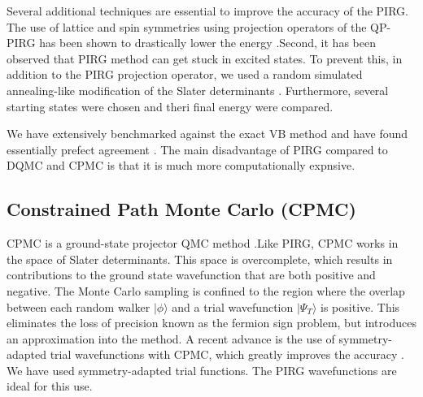\documentclass[a4paper,12pt]{article}
\begin{document}
Several additional techniques are essential to improve the accuracy of the PIRG. The use of lattice and spin symmetries using projection 
operators of the QP-PIRG has been shown to drastically lower the energy \cite{mizusaki06a}.Second, it has been observed that PIRG method can get 
stuck in excited states. To prevent this, in addition to the PIRG projection operator, we used a random simulated annealing-like modification
of the Slater determinants \cite{sahebsara06a}. Furthermore, several starting states were chosen and theri final energy were compared.

We have extensively benchmarked against the exact VB method and have found essentially prefect agreement \cite{dayal11a}. The main disadvantage 
of PIRG compared to DQMC and CPMC is that it is much more computationally expnsive.

\subsection{Constrained Path Monte Carlo (CPMC)}
CPMC is a ground-state projector QMC method \cite{zhang97a}.Like PIRG, CPMC works in the space of Slater determinants. This space is overcomplete, which results
in contributions to the ground state wavefunction that are both positive and negative. The Monte Carlo
sampling is confined to the region where the overlap between each random walker $|\phi\rangle$ and a trial wavefunction
$|\Psi_{T}\rangle$ is positive. This eliminates the loss of precision known as the fermion sign problem, but
introduces an approximation into the method. A recent advance is the use of symmetry-adapted trial wavefunctions
with CPMC, which greatly improves the accuracy \cite{shi14a}. We have used symmetry-adapted trial functions. 
The PIRG wavefunctions are ideal for this use.

 
\end{document}

